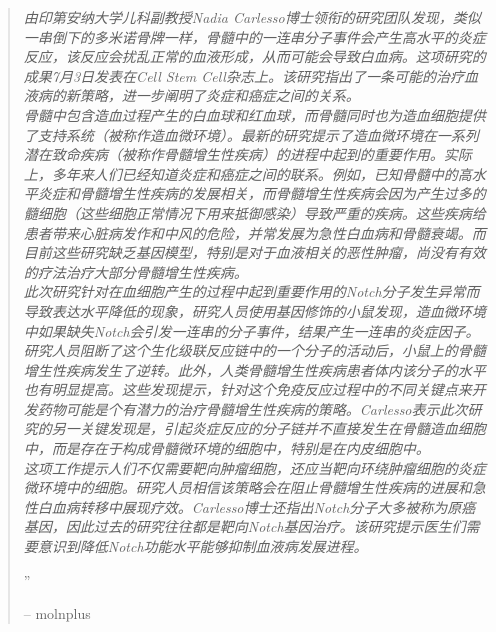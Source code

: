 \documentclass[10pt,a4paper]{article}
\begin{document}
\begin{multicols}{2} %


\begin{quotation}

\noindent\normalsize\textit{由印第安纳大学儿科副教授Nadia Carlesso博士领衔的研究团队发现，类似一串倒下的多米诺骨牌一样，骨髓中的一连串分子事件会产生高水平的炎症反应，该反应会扰乱正常的血液形成，从而可能会导致白血病。这项研究的成果7月3日发表在Cell Stem Cell杂志上。该研究指出了一条可能的治疗血液病的新策略，进一步阐明了炎症和癌症之间的关系。\\
骨髓中包含造血过程产生的白血球和红血球，而骨髓同时也为造血细胞提供了支持系统（被称作造血微环境）。最新的研究提示了造血微环境在一系列潜在致命疾病（被称作骨髓增生性疾病）的进程中起到的重要作用。实际上，多年来人们已经知道炎症和癌症之间的联系。例如，已知骨髓中的高水平炎症和骨髓增生性疾病的发展相关，而骨髓增生性疾病会因为产生过多的髓细胞（这些细胞正常情况下用来抵御感染）导致严重的疾病。这些疾病给患者带来心脏病发作和中风的危险，并常发展为急性白血病和骨髓衰竭。而目前这些研究缺乏基因模型，特别是对于血液相关的恶性肿瘤，尚没有有效的疗法治疗大部分骨髓增生性疾病。\\
此次研究针对在血细胞产生的过程中起到重要作用的Notch分子发生异常而导致表达水平降低的现象，研究人员使用基因修饰的小鼠发现，造血微环境中如果缺失Notch会引发一连串的分子事件，结果产生一连串的炎症因子。研究人员阻断了这个生化级联反应链中的一个分子的活动后，小鼠上的骨髓增生性疾病发生了逆转。此外，人类骨髓增生性疾病患者体内该分子的水平也有明显提高。这些发现提示，针对这个免疫反应过程中的不同关键点来开发药物可能是个有潜力的治疗骨髓增生性疾病的策略。Carlesso表示此次研究的另一关键发现是，引起炎症反应的分子链并不直接发生在骨髓造血细胞中，而是存在于构成骨髓微环境的细胞中，特别是在内皮细胞中。\\
这项工作提示人们不仅需要靶向肿瘤细胞，还应当靶向环绕肿瘤细胞的炎症微环境中的细胞。研究人员相信该策略会在阻止骨髓增生性疾病的进展和急性白血病转移中展现疗效。Carlesso博士还指出Notch分子大多被称为原癌基因，因此过去的研究往往都是靶向Notch基因治疗。该研究提示医生们需要意识到降低Notch功能水平能够抑制血液病发展进程。}


\hfill{\Huge''}

\hfill-- molnplus
\end{quotation}






\end{multicols}
\end{document}
